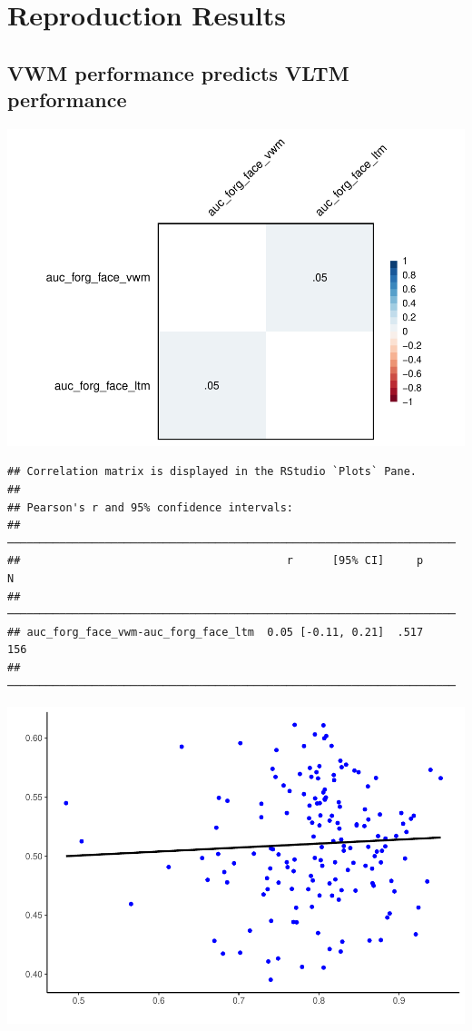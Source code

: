 \documentclass[
  man]{apa6}
\begin{document}
\hypertarget{reproduction-results}{%
\section{Reproduction Results}\label{reproduction-results}}

\hypertarget{vwm-performance-predicts-vltm-performance}{%
\subsection{VWM performance predicts VLTM performance}\label{vwm-performance-predicts-vltm-performance}}

\includegraphics{Script_Re_Greer_2023_group1Rock_2023_files/figure-latex/plot-1.pdf}

\begin{verbatim}
## Correlation matrix is displayed in the RStudio `Plots` Pane.
## 
## Pearson's r and 95% confidence intervals:
## ─────────────────────────────────────────────────────────────────────
##                                         r      [95% CI]     p       N
## ─────────────────────────────────────────────────────────────────────
## auc_forg_face_vwm-auc_forg_face_ltm  0.05 [-0.11, 0.21]  .517     156
## ─────────────────────────────────────────────────────────────────────
\end{verbatim}

\includegraphics{Script_Re_Greer_2023_group1Rock_2023_files/figure-latex/plot-2.pdf}
\end{document}
